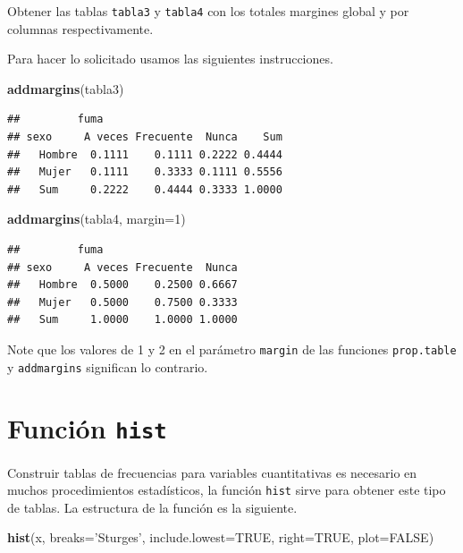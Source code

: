 \documentclass[10pt,]{krantz}
\makeatletter
\newenvironment{Shaded}{\begin{snugshade}}{\end{snugshade}}
\newcommand{\KeywordTok}[1]{\textcolor[rgb]{0.13,0.29,0.53}{\textbf{#1}}}
\newcommand{\DataTypeTok}[1]{\textcolor[rgb]{0.13,0.29,0.53}{#1}}
\newcommand{\DecValTok}[1]{\textcolor[rgb]{0.00,0.00,0.81}{#1}}
\newcommand{\StringTok}[1]{\textcolor[rgb]{0.31,0.60,0.02}{#1}}
\newcommand{\OtherTok}[1]{\textcolor[rgb]{0.56,0.35,0.01}{#1}}
\newcommand{\NormalTok}[1]{#1}
\newenvironment{kframe}{%
\medskip{}
\setlength{\fboxsep}{.8em}
 \def\at@end@of@kframe{}%
 \ifinner\ifhmode%
  \def\at@end@of@kframe{\end{minipage}}%
  \begin{minipage}{\columnwidth}%
 \fi\fi%
 \def\FrameCommand##1{\hskip\@totalleftmargin \hskip-\fboxsep
 \colorbox{shadecolor}{##1}\hskip-\fboxsep
     \hskip-\linewidth \hskip-\@totalleftmargin \hskip\columnwidth}%
 \MakeFramed {\advance\hsize-\width
   \@totalleftmargin\z@ \linewidth\hsize
   \@setminipage}}%
 {\par\unskip\endMakeFramed%
 \at@end@of@kframe}
\renewenvironment{Shaded}{\begin{kframe}}{\end{kframe}}
\let\BeginKnitrBlock\begin \let\EndKnitrBlock\end
\makeatother
\begin{document}
Obtener las tablas \texttt{tabla3} y \texttt{tabla4} con los totales
margines global y por columnas respectivamente.

Para hacer lo solicitado usamos las siguientes instrucciones.

\begin{Shaded}
\begin{Highlighting}[]
\KeywordTok{addmargins}\NormalTok{(tabla3)}
\end{Highlighting}
\end{Shaded}

\begin{verbatim}
##         fuma
## sexo     A veces Frecuente  Nunca    Sum
##   Hombre  0.1111    0.1111 0.2222 0.4444
##   Mujer   0.1111    0.3333 0.1111 0.5556
##   Sum     0.2222    0.4444 0.3333 1.0000
\end{verbatim}

\begin{Shaded}
\begin{Highlighting}[]
\KeywordTok{addmargins}\NormalTok{(tabla4, }\DataTypeTok{margin=}\DecValTok{1}\NormalTok{)}
\end{Highlighting}
\end{Shaded}

\begin{verbatim}
##         fuma
## sexo     A veces Frecuente  Nunca
##   Hombre  0.5000    0.2500 0.6667
##   Mujer   0.5000    0.7500 0.3333
##   Sum     1.0000    1.0000 1.0000
\end{verbatim}

\BeginKnitrBlock{rmdwarning}
Note que los valores de 1 y 2 en el parámetro \texttt{margin} de las
funciones \texttt{prop.table} y \texttt{addmargins} significan lo
contrario.
\EndKnitrBlock{rmdwarning}

\section{\texorpdfstring{Función \texttt{hist}
}{Función hist }}\label{funcion-hist}

Construir tablas de frecuencias para variables cuantitativas es
necesario en muchos procedimientos estadísticos, la función
\texttt{hist} sirve para obtener este tipo de tablas. La estructura de
la función es la siguiente.

\begin{Shaded}
\begin{Highlighting}[]
\KeywordTok{hist}\NormalTok{(x, }\DataTypeTok{breaks=}\StringTok{'Sturges'}\NormalTok{, }\DataTypeTok{include.lowest=}\OtherTok{TRUE}\NormalTok{, }\DataTypeTok{right=}\OtherTok{TRUE}\NormalTok{, }
     \DataTypeTok{plot=}\OtherTok{FALSE}\NormalTok{)}
\end{Highlighting}
\end{Shaded}
\end{document}
